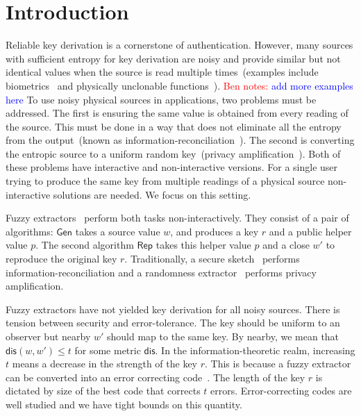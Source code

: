 \documentclass[11pt]{article}
\newcommand{\class}[1]{{\ensuremath{\mathsf{#1}}}}
\newcommand{\gen}{\ensuremath{\class{Gen}}\xspace}
\newcommand{\rep}{\ensuremath{\class{Rep}}\xspace}
\newcommand{\dis}{\ensuremath{\mathsf{dis}}}
\newcommand{\authnote}[2]{{\textcolor{red}{\textsf{#1 notes: }\textcolor{blue}{ #2}}\marginpar{\textcolor{red}{\textbf{!!!!!}}}}}
\newcommand{\authnote}[2]{}
\newcommand{\bnote}[1]{{\authnote{Ben}{#1}}}
\begin{document}
\section{Introduction}\label{sec:introduction}
Reliable key derivation is a cornerstone of authentication.  However, many sources with sufficient entropy for key derivation are noisy and provide similar but not identical values when the source is read multiple times~(examples include biometrics~\cite{daugman2004} and physically unclonable functions~\cite{pappu2002physical}). \bnote{add more examples here} To use noisy physical sources in applications, two problems must be addressed.  The first is ensuring the same value is obtained from every reading of the source.  This must be done in a way that does not eliminate all the entropy from the output~(known as information-reconciliation~\cite{bennett1988privacy}).  The second is converting the entropic source to a uniform random key~(privacy amplification~\cite{bennett1988privacy}).  Both of these problems have interactive and non-interactive versions.  For a single user trying to produce the same key from multiple readings of a physical source non-interactive solutions are needed.  We focus on this setting.  %

Fuzzy extractors~\cite{DBLP:journals/siamcomp/DodisORS08} perform both tasks non-interactively.  They consist of a pair of algorithms: \gen takes a source value $w$, and produces a key $r$ and a public helper value $p$.  The second algorithm \rep takes this helper value $p$ and a close $w'$ to reproduce the original key $r$.  Traditionally, a secure sketch~\cite{DBLP:journals/siamcomp/DodisORS08} performs information-reconciliation and a randomness extractor~\cite{nisan1993randomness} performs privacy amplification.

Fuzzy extractors have not yielded key derivation for all noisy sources.
There is tension between security and error-tolerance.  The key should be uniform to an observer but nearby $w'$ should map to the same key.  By nearby, we mean that $\dis(w, w')\leq t$ for some metric $\dis$.  In the information-theoretic realm, increasing $t$ means a decrease in the strength of the key $r$.  This is because a fuzzy extractor can be converted into an error correcting code~\cite[Appendix C]{DBLP:journals/siamcomp/DodisORS08}.  The length of the key $r$ is dictated by size of the best code that corrects $t$ errors.  Error-correcting codes are well studied and we have tight bounds on this quantity. %
\end{document}

